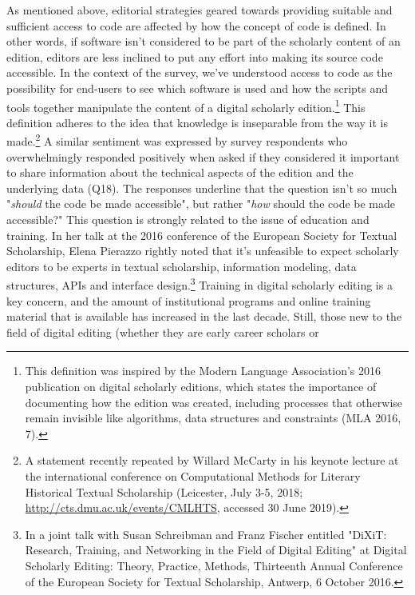 \begin{paper}
As mentioned above, editorial strategies geared towards providing
suitable and sufficient access to code are affected by how the concept
of code is defined. In other words, if software isn't considered to be
part of the scholarly content of an edition, editors are less inclined
to put any effort into making its source code accessible. In the context
of the survey, we've understood access to code as the possibility for
end-users to see which software is used and how the scripts and tools
together manipulate the content of a digital scholarly
edition.\footnote{This definition was inspired by the Modern Language
  Association's 2016 publication on digital scholarly editions, which
  states the importance of documenting how the edition was created,
  including processes that otherwise remain invisible like algorithms,
  data structures and constraints (MLA 2016, 7).} This definition
adheres to the idea that knowledge is inseparable from the way it is
made.\footnote{A statement recently repeated by Willard McCarty in his
  keynote lecture at the international conference on Computational
  Methods for Literary Historical Textual Scholarship (Leicester, July
  3-5, 2018; \href{http://cts.dmu.ac.uk/events/CMLHTS/}{{http://cts.dmu.ac.uk/events/CMLHTS}},
  accessed 30 June 2019).} A similar sentiment was expressed by survey
respondents who overwhelmingly responded positively when asked if they
considered it important to share information about the technical aspects
of the edition and the underlying data (Q18). The responses underline
that the question isn't so much "\emph{should} the code be made
accessible", but rather "\emph{how} should the code be made accessible?" This question is strongly related
to the issue of education and training. In her talk at the 2016
conference of the European Society for Textual Scholarship, Elena
Pierazzo rightly noted that it's unfeasible to expect scholarly editors
to be experts in textual scholarship, information modeling, data
structures, APIs and interface design.\footnote{In a joint talk with
  Susan Schreibman and Franz Fischer entitled "DiXiT: Research,
  Training, and Networking in the Field of Digital Editing" at Digital
  Scholarly Editing: Theory, Practice, Methods, Thirteenth Annual
  Conference of the European Society for Textual Scholarship, Antwerp, 6
  October 2016.} Training in digital scholarly editing is a key concern,
and the amount of institutional programs and online training material
that is available has increased in the last decade. Still, those new to
the field of digital editing (whether they are early career scholars or

\end{paper}
